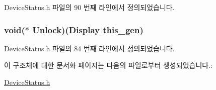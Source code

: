 Device\-Status.\-h 파일의 90 번째 라인에서 정의되었습니다.

\hypertarget{struct___display_a2997a5ca8fcbf98731edc07b55919203}{
\subsubsection[{Unlock}]{\setlength{\rightskip}{0pt plus 5cm}void($\ast$  Unlock)({\bf Display} this\-\_\-gen)}}\label{struct___display_a2997a5ca8fcbf98731edc07b55919203}


Device\-Status.\-h 파일의 84 번째 라인에서 정의되었습니다.



이 구조체에 대한 문서화 페이지는 다음의 파일로부터 생성되었습니다.\-:\begin{DoxyCompactItemize}
\item 
\hyperlink{_device_status_8h}{Device\-Status.\-h}\end{DoxyCompactItemize}
